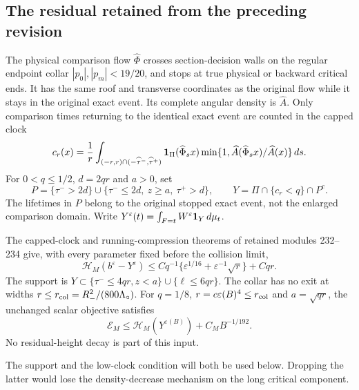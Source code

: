 \subsection{The residual retained from the preceding revision}
The physical comparison flow $\widehat\Phi$ crosses section-decision
walls on the regular endpoint collar $|p_0|,|p_m|<19/20$, and stops
at true physical or backward critical ends. It has the same roof and
transverse coordinates as the original flow while it stays in the
original exact event. Its complete angular density is $\widehat A$.
Only comparison times returning to the identical exact event are
counted in the capped clock
\[
 c_r(x)=\frac1r\int_{(-r,r)\cap(-\widehat\tau^-,\widehat\tau^+)}
 \mathbf1_\Pi(\widehat\Phi_sx)
 \min\{1,\widehat A(\widehat\Phi_sx)/\widehat A(x)\}\,ds.
\]
For $0<q\le1/2$, $d=2qr$ and $a>0$, set
\[
 P=\{\tau^->2d\}\cup
     \{\tau^-\le2d,\ z\ge a,\ \tau^+>d\},\qquad
 Y=\Pi\cap\{c_r<q\}\cap P^c.
\]
The lifetimes in $P$ belong to the original stopped exact event,
not the enlarged comparison domain. Write
$Y^\varepsilon(t)=\int_{F=t}W^\varepsilon\mathbf1_Y\,d\mu_t$.

\begin{inputstatement}
\label{input:v98-recovered}
The capped-clock and running-compression theorems of retained modules
232--234 give, with every parameter fixed before the collision limit,
\[
 \mathcal H_M(b^\varepsilon-Y^\varepsilon)
 \le Cq^{-1}\{\varepsilon^{1/16}+\varepsilon^{-1}\sqrt r\}+Cqr.
\]
The support is
$Y\subset\{\tau^-\le4qr,z<a\}\cup\{\ell\le6qr\}$.
The collar has no exit at widths
$r\le r_{\rm col}=R_-^2/(800\Lambda_\circ)$.
For $q=1/8$, $r=c\varepsilon(B)^4\le r_{\rm col}$ and
$a=\sqrt{qr}$, the unchanged scalar objective satisfies
\begin{equation}\label{eq:v98-retained-reduction}
       \mathcal E_M\le\mathcal H_M(Y^{\varepsilon(B)})
                                      +C_MB^{-1/192}.
\end{equation}
No residual-height decay is part of this input.
\end{inputstatement}
The support and the low-clock condition will both be used below.
Dropping the latter would lose the density-decrease mechanism on the
long critical component.
